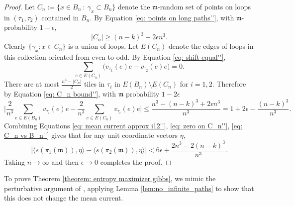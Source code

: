 \documentclass[11pt]{article}
\theoremstyle{remark}
\theoremstyle{definition}
\begin{document}
\begin{proof}
Let $C_n:=\{x\in B_n~:~ \gamma_x\subset B_n\}$ denote the $\mathfrak m$-random set of points on loops in $(\tau_1,\tau_2)$ contained in $B_n$. By Equation \eqref{eq: points on long paths''}, with $\mathfrak m$-probability $1-\epsilon$,
\begin{equation}\label{eq: C_n bound''}
    |C_n| \geq (n-k)^3 - 2\epsilon n^3.
\end{equation}
Clearly $\{\gamma_x: x\in C_n\}$ is a union of loops. Let $E(C_n)$ denote the edges of loops in this collection oriented from even to odd. By Equation \eqref{eq: shift equal''},
\begin{equation}\label{eq: zero on C_n''}
    \sum_{e\in E(C_n)} \bigg(v_{\tau_1}(e) e- v_{\tau_2}(e) e\bigg) = 0.
\end{equation}
There are at most $\frac{n^3 - |C_n|}{2}$ tiles in $\tau_i$ in $E(B_n)\setminus E(C_n)$ for $i=1,2$. Therefore by Equation \eqref{eq: C_n bound''}, with $\mathfrak m$ probability $1-2\epsilon$ 
\begin{equation}\label{eq: C_n vs B_n''}
    \bigg\lvert \frac{2}{n^3}\sum_{e\in E(B_n)} v_{\tau_i}(e)e - \frac{2}{n^3}\sum_{e\in E(C_n)} v_{\tau_i}(e)e \bigg\rvert \leq \frac{n^3 - (n-k)^3+2\epsilon n^3}{n^3} = 1 + 2\epsilon - \frac{(n-k)^3}{n^3}.
\end{equation}
Combining Equations \eqref{eq: mean current approx i12''}, \eqref{eq: zero on C_n''}, \eqref{eq: C_n vs B_n''} gives that for any unit coordinate vectors $\eta$,
\begin{equation}
    \bigg\lvert \langle s(\pi_1(\mathfrak m)), \eta\rangle - \langle s(\pi_2(\mathfrak m)), \eta\rangle \bigg\rvert < 6 \epsilon + \frac{2n^3 - 2(n-k)^3}{n^3}.
\end{equation}
Taking $n\to \infty$ and then $\epsilon\to 0$ completes the proof.



\end{proof}



To prove Theorem \ref{theorem: entropy maximizer gibbs}, we mimic the perturbative argument of \cite[Proposition 1.19]{burton1994non}, applying Lemma \ref{lem:no_infinite_paths} to show that this does not change the mean current. 
\end{document}
